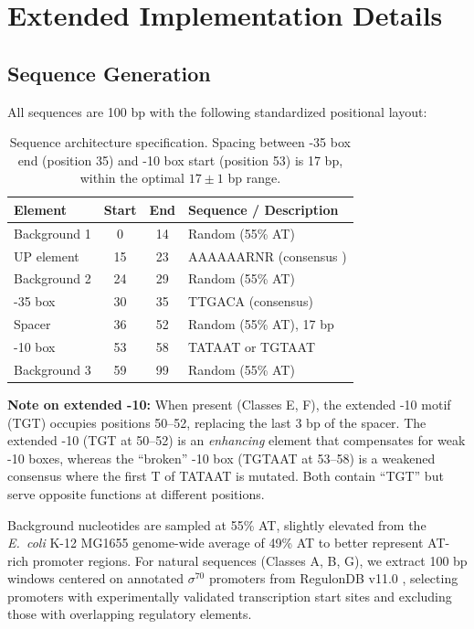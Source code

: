 \documentclass{article}
\begin{document}



\newpage
\appendix
\onecolumn

\section{Extended Implementation Details}
\label{app:methods}

\subsection{Sequence Generation}

All sequences are 100 bp with the following standardized positional layout:

\begin{table}[ht]
\caption{Sequence architecture specification. Spacing between -35 box end (position 35)
         and -10 box start (position 53) is 17 bp, within the optimal $17{\pm}1$ bp range.}
\label{tab:seq_layout}
\centering\small
\begin{tabular}{lccl}
\toprule
Element & Start & End & Sequence / Description \\
\midrule
Background 1 & 0  & 14 & Random (55\% AT) \\
UP element   & 15 & 23 & AAAAAARNR (consensus \citep{estrem1998identification}) \\
Background 2 & 24 & 29 & Random (55\% AT) \\
-35 box      & 30 & 35 & TTGACA (consensus) \\
Spacer       & 36 & 52 & Random (55\% AT), 17 bp \\
-10 box      & 53 & 58 & TATAAT or TGTAAT \\
Background 3 & 59 & 99 & Random (55\% AT) \\
\bottomrule
\end{tabular}
\end{table}

\textbf{Note on extended -10:} When present (Classes E, F), the extended -10 motif (TGT) occupies
positions 50--52, replacing the last 3 bp of the spacer.
The extended -10 (TGT at 50--52) is an \emph{enhancing} element that compensates for weak -10
boxes, whereas the ``broken'' -10 box (TGTAAT at 53--58) is a weakened consensus where the
first T of TATAAT is mutated. Both contain ``TGT'' but serve opposite functions at different
positions.

Background nucleotides are sampled at 55\% AT, slightly elevated from the \textit{E.\ coli}
K-12 MG1655 genome-wide average of 49\% AT \citep{blattner1997complete} to better represent
AT-rich promoter regions. For natural sequences (Classes A, B, G), we extract 100 bp windows
centered on annotated $\sigma^{70}$ promoters from RegulonDB v11.0
\citep{tierrafria2022regulondb}, selecting promoters with experimentally validated
transcription start sites and excluding those with overlapping regulatory elements.
\end{document}
